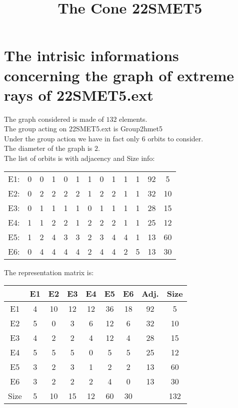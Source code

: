 \documentclass[12pt]{article}
\title{The Cone 22SMET5}
\begin{document}
\maketitle
\section{The intrisic informations concerning the graph of extreme rays of 22SMET5.ext}
The graph considered is made of $132$ elements.\\
The group acting on 22SMET5.ext is Group2hmet5\\
Under the group action we have in fact only $6$ orbits to consider.\\
The diameter of the graph is $2$.\\
The list of orbits is with adjacency and Size info:
\begin{center}
\scriptsize
\begin{tabular}{ccccccccccc|c|c}
E1:&0&0&1&0&1&1&0&1&1&1&92&5\\
E2:&0&2&2&2&2&1&2&2&1&1&32&10\\
E3:&0&1&1&1&1&0&1&1&1&1&28&15\\
E4:&1&1&2&2&1&2&2&2&1&1&25&12\\
E5:&1&2&4&3&3&2&3&4&4&1&13&60\\
E6:&0&4&4&4&4&2&4&4&2&5&13&30\\
\end{tabular}
\end{center}
The representation matrix is:
\begin{center}
\scriptsize
\begin{tabular}{|c|cccccc|c|c|}
\hline
&E1&E2&E3&E4&E5&E6&Adj.&Size\\
\hline
E1& 4& 10& 12& 12& 36& 18&92&5\\
E2& 5& 0& 3& 6& 12& 6&32&10\\
E3& 4& 2& 2& 4& 12& 4&28&15\\
E4& 5& 5& 5& 0& 5& 5&25&12\\
E5& 3& 2& 3& 1& 2& 2&13&60\\
E6& 3& 2& 2& 2& 4& 0&13&30\\
\hline
Size&5&10&15&12&60&30&&132\\
\hline
\end{tabular}
\end{center}
\end{document}
